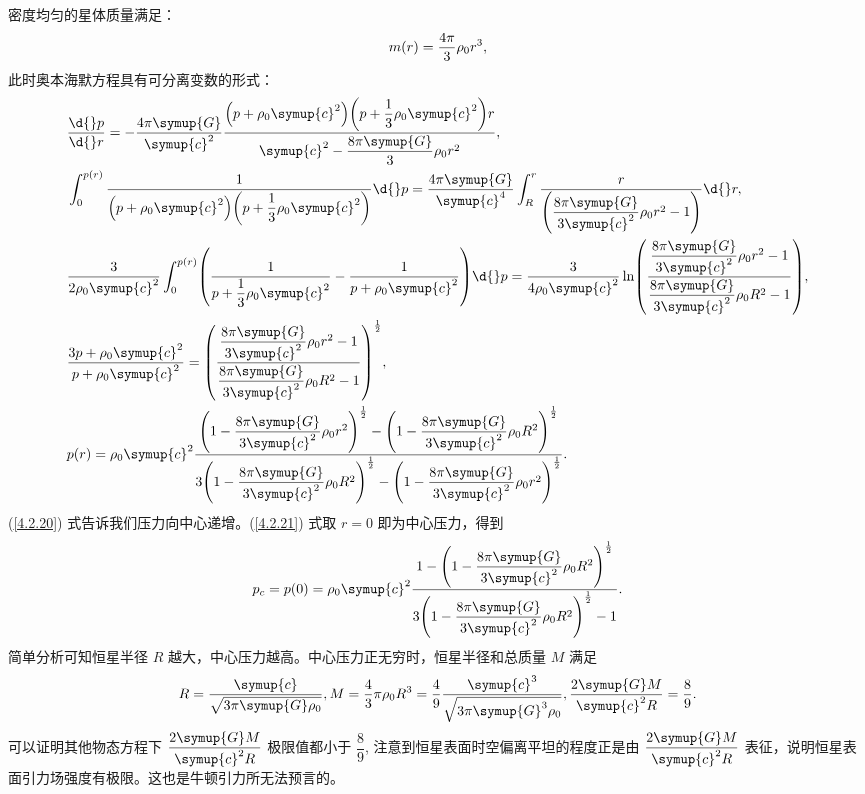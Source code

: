 \documentclass[UTF8, 12pt, a4paper, oneside, onecolumn, fontset=none]{ctexart}
\begin{document}
密度均匀的星体质量满足：
\begin{equation}
m\mleft(r\mright)=\frac{4\pi}{3}\rho_{0}r^{3},\label{4.2.19}
\end{equation}
此时奥本海默方程具有可分离变数的形式：
\begin{align}
&\frac{\d{}p}{\d{}r}=-\frac{4\pi\symup{G}}{\symup{c}^{2}}\frac{\mleft(p+\rho_{0}\symup{c}^{2}\mright)\mleft(p+\dfrac{1}{3}\rho_{0}\symup{c}^{2}\mright) r}{\symup{c}^{2}-\dfrac{8\pi\symup{G}}{3}\rho_{0}r^{2}},\label{4.2.20}\\
&\int_{0}^{p\mleft(r\mright)}\frac{1}{\mleft(p+\rho_{0}\symup{c}^{2}\mright)\mleft(p+\dfrac{1}{3}\rho_{0}\symup{c}^{2}\mright)}\d{}p=\frac{4\pi\symup{G}}{\symup{c}^{4}}\int_{R}^{r}\frac{r}{\mleft(\dfrac{8\pi\symup{G}}{3\symup{c}^{2}}\rho_{0}r^{2}-1\mright)}\d{}r,\notag\\
&\frac{3}{2\rho_{0}\symup{c}^{2}}\int_{0}^{p\mleft(r\mright)}\mleft(\frac{1}{p+\dfrac{1}{3}\rho_{0}\symup{c}^{2}}-\frac{1}{p+\rho_{0}\symup{c}^{2}}\mright)\d{}p=\frac{3}{4\rho_{0}\symup{c}^{2}}\ln\mleft(\frac{\dfrac{8\pi\symup{G}}{3\symup{c}^{2}}\rho_{0}r^{2}-1}{\dfrac{8\pi\symup{G}}{3\symup{c}^{2}}\rho_{0}R^{2}-1}\mright),\notag\\
&\frac{3p+\rho_{0}\symup{c}^{2}}{p+\rho_{0}\symup{c}^{2}}=\mleft(\frac{\dfrac{8\pi\symup{G}}{3\symup{c}^{2}}\rho_{0}r^{2}-1}{\dfrac{8\pi\symup{G}}{3\symup{c}^{2}}\rho_{0}R^{2}-1}\mright)^{\frac{1}{2}},\notag\\
&p\mleft(r\mright)=\rho_{0}\symup{c}^{2}\frac{\mleft(1-\dfrac{8\pi\symup{G}}{3\symup{c}^{2}}\rho_{0}r^{2}\mright)^{\frac{1}{2}}-\mleft(1-\dfrac{8\pi\symup{G}}{3\symup{c}^{2}}\rho_{0}R^{2}\mright)^{\frac{1}{2}}}{3\mleft(1-\dfrac{8\pi\symup{G}}{3\symup{c}^{2}}\rho_{0}R^{2}\mright)^{\frac{1}{2}}-\mleft(1-\dfrac{8\pi\symup{G}}{3\symup{c}^{2}}\rho_{0}r^{2}\mright)^{\frac{1}{2}}}.\label{4.2.21}
\end{align}
(\ref{4.2.20}) 式告诉我们压力向中心递增。(\ref{4.2.21}) 式取 $r=0$ 即为中心压力，得到
\begin{equation}
p_{c}=p\mleft(0\mright)=\rho_{0}\symup{c}^{2}\frac{1-\mleft(1-\dfrac{8\pi\symup{G}}{3\symup{c}^{2}}\rho_{0}R^{2}\mright)^{\frac{1}{2}}}{3\mleft(1-\dfrac{8\pi\symup{G}}{3\symup{c}^{2}}\rho_{0}R^{2}\mright)^{\frac{1}{2}}-1}.
\end{equation}
简单分析可知恒星半径 $R$ 越大，中心压力越高。中心压力正无穷时，恒星半径和总质量 $M$ 满足
\begin{equation}
R=\frac{\symup{c}}{\sqrt{3\pi\symup{G}\rho_{0}}}, M=\frac{4}{3}\pi \rho_{0}R^{3}=\frac{4}{9}\frac{\symup{c}^{3}}{\sqrt{3\pi\symup{G}^{3}\rho_{0}}},\frac{2\symup{G}M}{\symup{c}^{2}R}=\frac{8}{9}.
\end{equation}
可以证明其他物态方程下 $\dfrac{2\symup{G}M}{\symup{c}^{2}R}$ 极限值都小于 $\dfrac{8}{9}$, 注意到恒星表面时空偏离平坦的程度正是由 $\dfrac{2\symup{G}M}{\symup{c}^{2}R}$ 表征，说明恒星表面引力场强度有极限。这也是牛顿引力所无法预言的。
\end{document}
